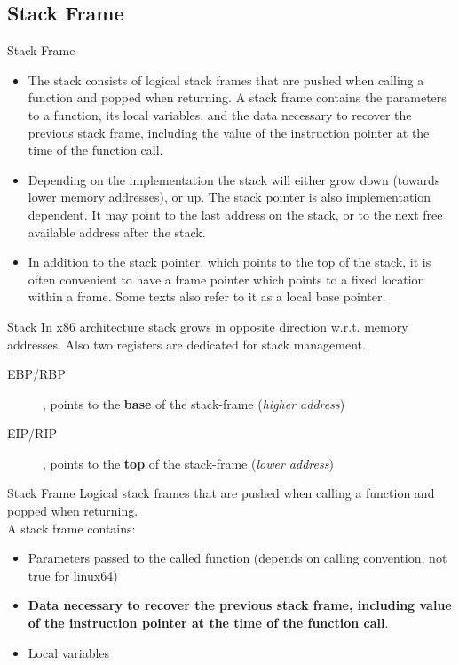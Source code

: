 \subsection{Stack Frame}
\begin{frame}{Stack Frame}

\begin{itemize}
\item The stack consists of logical stack frames that are pushed when calling a
function and popped when returning. A stack frame contains the parameters to a
function, its local variables, and the data necessary to recover the previous
stack frame, including the value of the instruction pointer at the time of the
function call.
\item Depending on the implementation the stack will either grow down (towards
lower memory addresses), or up. The stack pointer is also implementation
dependent. It may point to the last address on the stack, or to the next free
available address after the stack. 
\item In addition to the stack pointer, which points to the top of the stack, it
is often convenient to have a frame pointer which points to a fixed location
within a frame. Some texts also refer to it as a local base pointer.
\end{itemize}

\framebreak

\begin{block}{Stack}
In x86 architecture stack grows in opposite direction w.r.t. memory addresses. 
Also two registers are dedicated for stack management.
\begin{description}
\item[EBP/RBP], points to the {\bf base} of the stack-frame (\emph{higher address})
\item[EIP/RIP], points to the {\bf top} of the stack-frame (\emph{lower address})
\end{description}
\end{block}

\framebreak

\begin{block}{Stack Frame}
Logical stack frames that are pushed when calling a function and popped when returning.\\
A stack frame contains:
\begin{itemize}
\item Parameters passed to the called function (depends on calling convention, not true for linux64)
\item {\bf Data necessary to recover the previous stack frame, including value of the instruction pointer at the time of the function call}.
\item Local variables
\end{itemize}
\end{block}


\end{frame}
